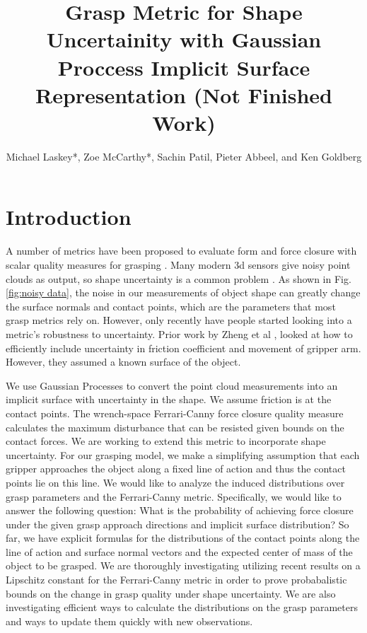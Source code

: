 \documentclass[letterpaper, 10 pt, conference]{ieeeconf}  %
\title{\LARGE \bf
Grasp Metric for Shape Uncertainity with Gaussian Proccess Implicit Surface Representation (Not Finished Work) }
\author{Michael Laskey*, Zoe McCarthy*, Sachin Patil, Pieter Abbeel, and Ken Goldberg}%
\begin{document}
\maketitle
\thispagestyle{empty}
\pagestyle{empty}





\section{Introduction}

\vspace{10pt}
 A number of metrics have been proposed to evaluate form and force closure with scalar quality measures for grasping \cite{bicchi2000}.  Many modern 3d sensors give noisy point clouds as output, so shape uncertainty is a common problem \cite{singhbigbird}. As shown in Fig. \ref{fig:noisy data}, the noise in our measurements of object shape can greatly change the surface normals and contact points, which are the parameters that most grasp metrics rely on.  However, only recently have people started looking into a metric's robustness to uncertainty. Prior work by Zheng et al \cite{zheng2005}, looked at how to efficiently include uncertainty in friction coefficient and movement of gripper arm. However, they assumed a known surface of the object.
 
We use Gaussian Processes \cite{rasmussen2006} to convert the point cloud measurements into an implicit surface with uncertainty in the shape.
We assume friction is at the contact points. 
The wrench-space Ferrari-Canny force closure quality measure \cite{ferrari1992} calculates the maximum disturbance that can be resisted given bounds on the contact forces.
We are working to extend this metric to incorporate shape uncertainty.
For our grasping model, we make a simplifying assumption that each gripper approaches the object along a fixed line of action and thus the contact points lie on this line.
We would like to analyze the induced distributions over grasp parameters and the Ferrari-Canny metric.
Specifically, we would like to answer the following question:
What is the probability of achieving force closure under the given grasp approach directions and implicit surface distribution?
So far, we have explicit formulas for the distributions of the contact points along the line of action and surface normal vectors and the expected center of mass of the object to be grasped.
We are thoroughly investigating utilizing recent results on a Lipschitz constant for the Ferrari-Canny metric \cite{pokorny2013classical} in order to prove probabalistic bounds on the change in grasp quality under shape uncertainty.
We are also investigating efficient ways to calculate the distributions on the grasp parameters and ways to update them quickly with new observations.
\end{document}
